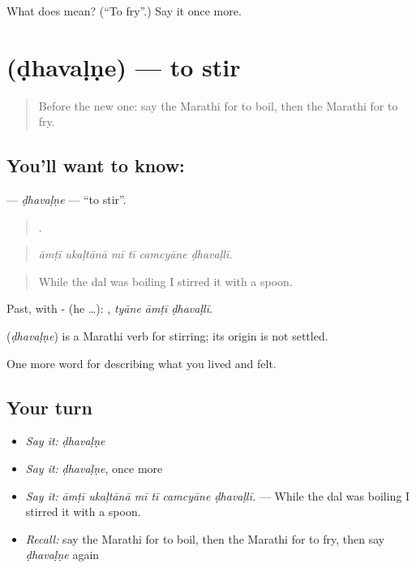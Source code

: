\begin{tcolorbox}[breakable,colback=teal!4,colframe=teal!35!black,title={Before you move on}]
What does  mean? (\textquotedblleft{}To fry\textquotedblright{}.) Say it once more.
\end{tcolorbox}
\section[\texorpdfstring{\mr{ढवळणे} (ḍhavaḷṇe)}{ढवळणे (ḍhavaḷṇe)}]{ (ḍhavaḷṇe) — to stir}

\label{lesson:MR-C527-dhavalne}



\begin{quote}
Before the new one: say the Marathi for to boil, then the Marathi for to fry.
\end{quote}

\subsection*{You'll want to know: }
\textbf{} — \emph{ḍhavaḷṇe} — \textquotedblleft{}to stir\textquotedblright{}.

\begin{quote}
     .
\end{quote}

\begin{quote}
\emph{āmṭī ukaḷtānā mī tī camcyāne ḍhavaḷlī.}
\end{quote}

\begin{quote}
While the dal was boiling I stirred it with a spoon.
\end{quote}

Past, with - (he …):   , \emph{tyāne āmṭī ḍhavaḷlī}.

\begin{cousinweb}
\textbf{} (\emph{ḍhavaḷṇe}) is a Marathi verb for stirring; its origin is not settled.
\end{cousinweb}

\begin{grammarlens}[title={What you've built}]
One more word for describing what you lived and felt.
\end{grammarlens}

\subsection*{Your turn}
\begin{itemize}
\raggedright
  \item \emph{Say it:} \emph{ḍhavaḷṇe}
  \item \emph{Say it:} \emph{ḍhavaḷṇe}, once more
  \item \emph{Say it:} \emph{āmṭī ukaḷtānā mī tī camcyāne ḍhavaḷlī.} — While the dal was boiling I stirred it with a spoon.
  \item \emph{Recall:} say the Marathi for to boil, then the Marathi for to fry, then say \emph{ḍhavaḷṇe} again
\end{itemize}

